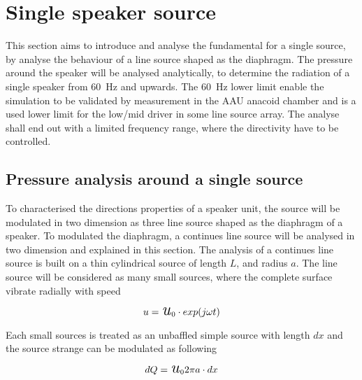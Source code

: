 \section{Single speaker source}
This section aims to introduce and analyse the fundamental for a single source, by analyse the behaviour of a line source shaped as the diaphragm. The pressure around the speaker will be analysed analytically, to determine the radiation of a single speaker from \SI{60}{\hertz} and upwards. The \SI{60}{\hertz} lower limit enable the simulation to be validated by measurement in the AAU anacoid chamber and is a used lower limit for the low/mid driver in some line source array.  The analyse shall end out with a limited frequency range, where the directivity have to be controlled.

\subsection{Pressure analysis around a single source}
To characterised the directions properties of a speaker unit, the source will be modulated in two dimension as three line source shaped as the diaphragm of a speaker. To modulated the diaphragm, a continues line source will be analysed in two dimension and explained in this section. The analysis of a continues line source is built on a thin cylindrical source of length $L$, and radius $a$. The line source will be considered as many small sources, where the complete surface vibrate radially with speed

\begin{equation}
u = \text{\textit{{\LARGE u}}}_{0} \cdot exp(j \omega t)
\end{equation}

    \startexplain
    \stopexplain
    
Each small sources is treated as an unbaffled simple source with length $dx$ and the source strange can be modulated as following      

\begin{equation}
dQ = \text{\textit{{\LARGE u}}}_{0} 2 \pi a \cdot dx
\end{equation}

    \startexplain
    \stopexplain    
 
